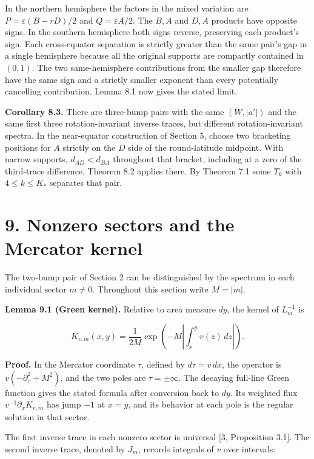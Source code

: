 \documentclass[11pt,letterpaper]{article}
\begin{document}
In the northern hemisphere the factors in the mixed variation are \(P=\varepsilon(B-rD)/2\)
and \(Q=\varepsilon A/2\). The \(B,A\) and \(D,A\) products have opposite signs. In the
southern hemisphere both signs reverse, preserving each product's sign. Each cross-equator
separation is strictly greater than the same pair's gap in a single hemisphere because all
the original supports are compactly contained in \((0,1)\). The two same-hemisphere
contributions from the smaller gap therefore have the same sign and a strictly smaller
exponent than every potentially cancelling contribution. Lemma 8.1 now gives the stated
limit.

\textbf{Corollary 8.3.} There are three-bump pairs with the same \((W,|a'|)\) and the same
first three rotation-invariant inverse traces, but different rotation-invariant spectra. In
the near-equator construction of Section 5, choose two bracketing positions for \(A\)
strictly on the \(D\) side of the round-latitude midpoint. With narrow supports,
\(d_{AD}<d_{BA}\) throughout that bracket, including at a zero of the third-trace
difference. Theorem 8.2 applies there. By Theorem 7.1 some \(T_k\) with \(4\le k\le K_*\)
separates that pair.

\section{9. Nonzero sectors and the Mercator
kernel}\label{nonzero-sectors-and-the-mercator-kernel}

The two-bump pair of Section 2 can be distinguished by the spectrum in each individual
sector \(m\ne0\). Throughout this section write \(M=|m|\).

\textbf{Lemma 9.1 (Green kernel).} Relative to area measure \(dy\), the kernel of
\(L_m^{-1}\) is

\[K_{v,m}(x,y)=\frac{1}{2M}\exp\left(-M\left|\int_x^y v(z)\,dz\right|\right).\]

\textbf{Proof.} In the Mercator coordinate \(\tau\), defined by \(d\tau=v\,dx\), the
operator is \(v(-\partial_\tau^2+M^2)\), and the two poles are \(\tau=\pm\infty\). The
decaying full-line Green function gives the stated formula after conversion back to \(dy\).
Its weighted flux \(v^{-1}\partial_x K_{v,m}\) has jump \(-1\) at \(x=y\), and its behavior
at each pole is the regular solution in that sector.

The first inverse trace in each nonzero sector is universal [3, Proposition 3.1]. The
second inverse trace, denoted by \(J_m\), records integrals of \(v\) over intervals:
\end{document}
